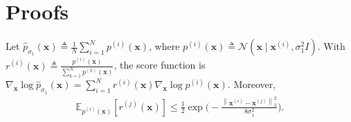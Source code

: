 \documentclass{article}
\newcommand{\mbb}[1]{\mathbb{#1}}
\newcommand{\mcal}{\mathcal}
\newcommand{\norm}[1]{\left\lVert#1\right\rVert}
\newenvironment{customprop}[1]
{\renewcommand\theinnercustomprop{#1}\innercustomprop}
{\endinnercustomprop}
\newcommand{\bfx}{\mathbf{x}}
\begin{document}
\section{Proofs}\label{app:proofs}
\begin{customprop}{\ref{prop:init_noise}}
Let $\hat{p}_{\sigma_1}(\bfx) \triangleq \frac{1}{N} \sum_{i=1}^N p^{(i)}(\bfx)$, where $p^{(i)}(\bfx) \triangleq \mcal{N}(\bfx \mid \bfx^{(i)}, \sigma_1^2 I)$. With $r^{(i)}(\bfx) \triangleq \frac{p^{(i)}(\bfx)}{\sum_{k=1}^N  p^{(k)}(\bfx) }$, the score function is $\nabla_\bfx \log \hat{p}_{\sigma_1}(\bfx) = \sum_{i=1}^N r^{(i)}(\bfx) \nabla_\bfx \log p^{(i)}(\bfx)$. Moreover,
\begin{align}
    \mbb{E}_{p^{(i)}(\bfx)}[r^{(j)}(\bfx)] \leq \frac{1}{2} \exp \bigg( -\frac{\norm{\bfx^{(i)} - \bfx^{(j)}}_2^2}{8\sigma_1^2} \bigg). \label{eqn:ratio2}
\end{align}
\end{customprop}
\end{document}
